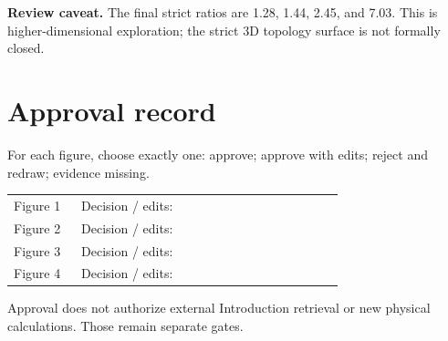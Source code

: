 \documentclass[10pt]{article}
\begin{document}
\textcolor{caveat}{\bfseries Review caveat.} The final strict ratios are 1.28,
1.44, 2.45, and 7.03. This is higher-dimensional exploration; the strict 3D
topology surface is not formally closed.
\newpage

\section*{Approval record}
For each figure, choose exactly one: approve; approve with edits; reject and
redraw; evidence missing.

\begin{tabular}{@{}p{0.18\linewidth}p{0.70\linewidth}@{}}
\toprule
Figure 1 & Decision / edits: \hrulefill\\[18pt]
Figure 2 & Decision / edits: \hrulefill\\[18pt]
Figure 3 & Decision / edits: \hrulefill\\[18pt]
Figure 4 & Decision / edits: \hrulefill\\[18pt]
\bottomrule
\end{tabular}

\vfill
Approval does not authorize external Introduction retrieval or new physical
calculations. Those remain separate gates.
\end{document}
